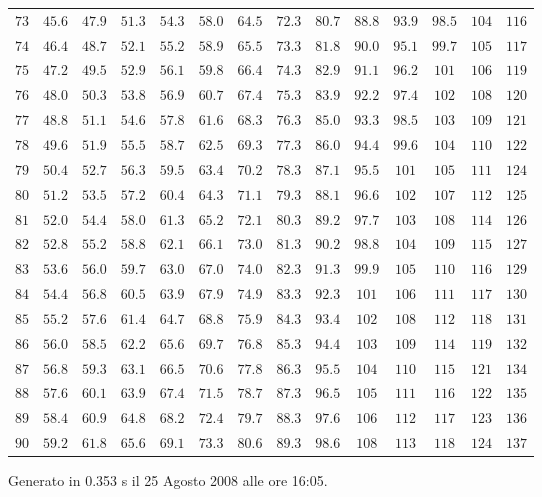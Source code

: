 \begin{table}[htb!]
\begin{center}
{\begin{tabular}{p{22 pt}ccccccccccccc}
$73$ & $45.6$ & $47.9$ & $51.3$ & $54.3$ & $58.0$ & $64.5$ & $72.3$ & $80.7$ & $88.8$ & $93.9$ & $98.5$ & $104$ & $116$\\
$74$ & $46.4$ & $48.7$ & $52.1$ & $55.2$ & $58.9$ & $65.5$ & $73.3$ & $81.8$ & $90.0$ & $95.1$ & $99.7$ & $105$ & $117$\\
$75$ & $47.2$ & $49.5$ & $52.9$ & $56.1$ & $59.8$ & $66.4$ & $74.3$ & $82.9$ & $91.1$ & $96.2$ & $101$ & $106$ & $119$\\
$76$ & $48.0$ & $50.3$ & $53.8$ & $56.9$ & $60.7$ & $67.4$ & $75.3$ & $83.9$ & $92.2$ & $97.4$ & $102$ & $108$ & $120$\\
$77$ & $48.8$ & $51.1$ & $54.6$ & $57.8$ & $61.6$ & $68.3$ & $76.3$ & $85.0$ & $93.3$ & $98.5$ & $103$ & $109$ & $121$\\
$78$ & $49.6$ & $51.9$ & $55.5$ & $58.7$ & $62.5$ & $69.3$ & $77.3$ & $86.0$ & $94.4$ & $99.6$ & $104$ & $110$ & $122$\\
$79$ & $50.4$ & $52.7$ & $56.3$ & $59.5$ & $63.4$ & $70.2$ & $78.3$ & $87.1$ & $95.5$ & $101$ & $105$ & $111$ & $124$\\
$80$ & $51.2$ & $53.5$ & $57.2$ & $60.4$ & $64.3$ & $71.1$ & $79.3$ & $88.1$ & $96.6$ & $102$ & $107$ & $112$ & $125$\\
$81$ & $52.0$ & $54.4$ & $58.0$ & $61.3$ & $65.2$ & $72.1$ & $80.3$ & $89.2$ & $97.7$ & $103$ & $108$ & $114$ & $126$\\
$82$ & $52.8$ & $55.2$ & $58.8$ & $62.1$ & $66.1$ & $73.0$ & $81.3$ & $90.2$ & $98.8$ & $104$ & $109$ & $115$ & $127$\\
$83$ & $53.6$ & $56.0$ & $59.7$ & $63.0$ & $67.0$ & $74.0$ & $82.3$ & $91.3$ & $99.9$ & $105$ & $110$ & $116$ & $129$\\
$84$ & $54.4$ & $56.8$ & $60.5$ & $63.9$ & $67.9$ & $74.9$ & $83.3$ & $92.3$ & $101$ & $106$ & $111$ & $117$ & $130$\\
$85$ & $55.2$ & $57.6$ & $61.4$ & $64.7$ & $68.8$ & $75.9$ & $84.3$ & $93.4$ & $102$ & $108$ & $112$ & $118$ & $131$\\
$86$ & $56.0$ & $58.5$ & $62.2$ & $65.6$ & $69.7$ & $76.8$ & $85.3$ & $94.4$ & $103$ & $109$ & $114$ & $119$ & $132$\\
$87$ & $56.8$ & $59.3$ & $63.1$ & $66.5$ & $70.6$ & $77.8$ & $86.3$ & $95.5$ & $104$ & $110$ & $115$ & $121$ & $134$\\
$88$ & $57.6$ & $60.1$ & $63.9$ & $67.4$ & $71.5$ & $78.7$ & $87.3$ & $96.5$ & $105$ & $111$ & $116$ & $122$ & $135$\\
$89$ & $58.4$ & $60.9$ & $64.8$ & $68.2$ & $72.4$ & $79.7$ & $88.3$ & $97.6$ & $106$ & $112$ & $117$ & $123$ & $136$\\
$90$ & $59.2$ & $61.8$ & $65.6$ & $69.1$ & $73.3$ & $80.6$ & $89.3$ & $98.6$ & $108$ & $113$ & $118$ & $124$ & $137$\\
\hline

\end{tabular}
}
\end{center}
\end{table}
\vfill
\hfill {\scriptsize Generato in 0.353 s il 25 Agosto 2008 alle ore 16:05.}
